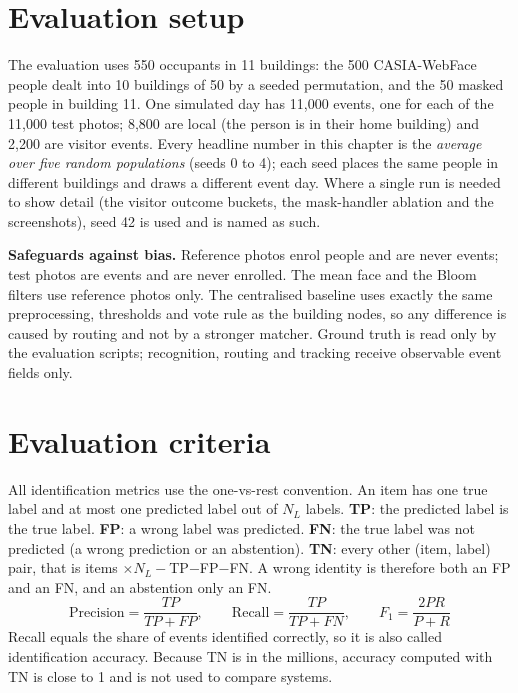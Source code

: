 \documentclass[12pt,a4paper,oneside]{report}
\begin{document}
\section{Evaluation setup}
The evaluation uses 550 occupants in 11 buildings: the 500 CASIA-WebFace people dealt into 10 buildings of 50 by a seeded permutation, and the 50 masked people in building 11. One simulated day has 11,000 events, one for each of the 11,000 test photos; 8,800 are local (the person is in their home building) and 2,200 are visitor events. Every headline number in this chapter is the \emph{average over five random populations} (seeds 0 to 4); each seed places the same people in different buildings and draws a different event day. Where a single run is needed to show detail (the visitor outcome buckets, the mask-handler ablation and the screenshots), seed 42 is used and is named as such.



\textbf{Safeguards against bias.} Reference photos enrol people and are never events; test photos are events and are never enrolled. The mean face and the Bloom filters use reference photos only. The centralised baseline uses exactly the same preprocessing, thresholds and vote rule as the building nodes, so any difference is caused by routing and not by a stronger matcher. Ground truth is read only by the evaluation scripts; recognition, routing and tracking receive observable event fields only.

\section{Evaluation criteria}
All identification metrics use the one-vs-rest convention. An item has one true label and at most one predicted label out of $N_L$ labels. \textbf{TP}: the predicted label is the true label. \textbf{FP}: a wrong label was predicted. \textbf{FN}: the true label was not predicted (a wrong prediction or an abstention). \textbf{TN}: every other (item, label) pair, that is items $\times N_L-$TP$-$FP$-$FN. A wrong identity is therefore both an FP and an FN, and an abstention only an FN.
\begin{equation}
\mathrm{Precision}=\frac{TP}{TP+FP},\qquad \mathrm{Recall}=\frac{TP}{TP+FN},\qquad F_1=\frac{2PR}{P+R}
\end{equation}
Recall equals the share of events identified correctly, so it is also called identification accuracy. Because TN is in the millions, accuracy computed with TN is close to 1 and is not used to compare systems.
\end{document}
